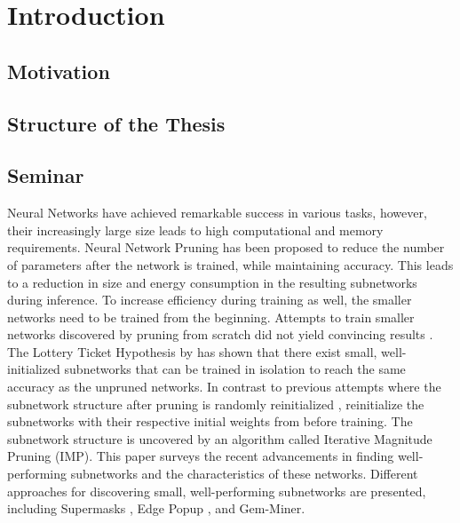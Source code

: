 \chapter{Introduction}
\section{Motivation}
\section{Structure of the Thesis}
\section{Seminar}
Neural Networks have achieved remarkable success in various tasks, however, their increasingly large size leads to high computational and memory requirements.
Neural Network Pruning \autocite{LeCun, OptimalBrainSurgeon, HanEtAl15, PruningFiltersForEfficientConvets} has been proposed to reduce the number of parameters after the network is trained, while maintaining accuracy.
This leads to a reduction in size \autocite{HanEtAl15} and energy consumption \autocite{YangCS17} in the resulting subnetworks during inference.
To increase efficiency during training as well, the smaller networks need to be trained from the beginning. Attempts to train smaller networks discovered by pruning from scratch did not yield convincing results \autocite{HanEtAl15, PruningFiltersForEfficientConvets}.
The Lottery Ticket Hypothesis by \textcite{DBLP:conf/iclr/FrankleC19} has shown that there exist small, well-initialized subnetworks that can be trained in isolation to reach the same accuracy as the unpruned networks. 
In contrast to previous attempts where the subnetwork structure after pruning is randomly reinitialized \autocite{HanEtAl15, PruningFiltersForEfficientConvets}, \textcite{DBLP:conf/iclr/FrankleC19} reinitialize the subnetworks with their respective initial weights from before training.
The subnetwork structure is uncovered by an algorithm called Iterative Magnitude Pruning (IMP).
This paper surveys the recent advancements in finding well-performing subnetworks and the characteristics of these networks. 
Different approaches for discovering small, well-performing subnetworks are presented, including Supermasks \autocite{DBLP:conf/nips/ZhouLLY19}, Edge Popup \autocite{DBLP:conf/cvpr/RamanujanWKFR20}, and Gem-Miner\autocite{RareGems}.